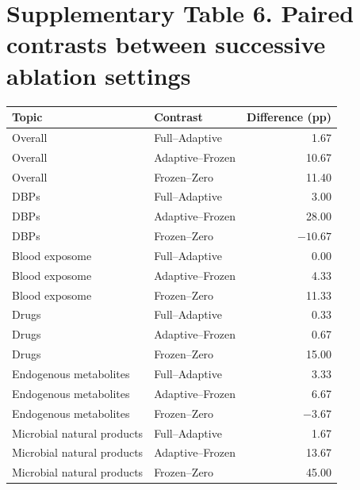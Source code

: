 \documentclass[10pt]{article}
\begin{document}
\section*{Supplementary Table 6. Paired contrasts between successive ablation settings}
\begin{center}\small
\begin{tabular}{llr}\toprule Topic & Contrast & Difference (pp)\\\midrule
Overall & Full--Adaptive & 1.67 \\
Overall & Adaptive--Frozen & 10.67 \\
Overall & Frozen--Zero & 11.40 \\\midrule
DBPs & Full--Adaptive & 3.00 \\
DBPs & Adaptive--Frozen & 28.00 \\
DBPs & Frozen--Zero & $-10.67$ \\\midrule
Blood exposome & Full--Adaptive & 0.00 \\
Blood exposome & Adaptive--Frozen & 4.33 \\
Blood exposome & Frozen--Zero & 11.33 \\\midrule
Drugs & Full--Adaptive & 0.33 \\
Drugs & Adaptive--Frozen & 0.67 \\
Drugs & Frozen--Zero & 15.00 \\\midrule
Endogenous metabolites & Full--Adaptive & 3.33 \\
Endogenous metabolites & Adaptive--Frozen & 6.67 \\
Endogenous metabolites & Frozen--Zero & $-3.67$ \\\midrule
Microbial natural products & Full--Adaptive & 1.67 \\
Microbial natural products & Adaptive--Frozen & 13.67 \\
Microbial natural products & Frozen--Zero & 45.00 \\
\bottomrule\end{tabular}\end{center}
\end{document}
